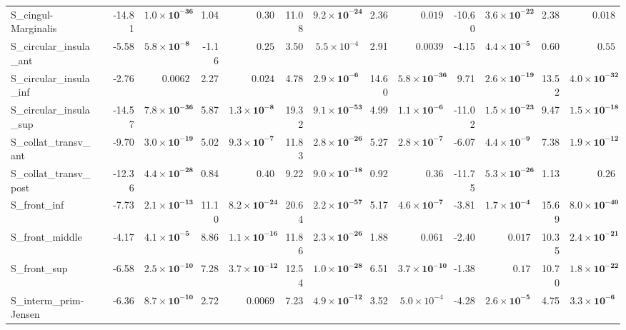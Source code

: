 {\begin{longtable}{llrrrrrrrrrrrr}
S\_cingul-Marginalis &  & -14.81 & $\mathbf{1.0{\times}10^{-36}}$ & 1.04 & $0.30$ & 11.08 & $\mathbf{9.2{\times}10^{-24}}$ & 2.36 & $0.019$ & -10.60 & $\mathbf{3.6{\times}10^{-22}}$ & 2.38 & $0.018$ \\
S\_circular\_insula\_ant &  & -5.58 & $\mathbf{5.8{\times}10^{-8}}$ & -1.16 & $0.25$ & 3.50 & $5.5{\times}10^{-4}$ & 2.91 & $0.0039$ & -4.15 & $\mathbf{4.4{\times}10^{-5}}$ & 0.60 & $0.55$ \\
S\_circular\_insula\_inf &  & -2.76 & $0.0062$ & 2.27 & $0.024$ & 4.78 & $\mathbf{2.9{\times}10^{-6}}$ & 14.60 & $\mathbf{5.8{\times}10^{-36}}$ & 9.71 & $\mathbf{2.6{\times}10^{-19}}$ & 13.52 & $\mathbf{4.0{\times}10^{-32}}$ \\
S\_circular\_insula\_sup &  & -14.57 & $\mathbf{7.8{\times}10^{-36}}$ & 5.87 & $\mathbf{1.3{\times}10^{-8}}$ & 19.32 & $\mathbf{9.1{\times}10^{-53}}$ & 4.99 & $\mathbf{1.1{\times}10^{-6}}$ & -11.02 & $\mathbf{1.5{\times}10^{-23}}$ & 9.47 & $\mathbf{1.5{\times}10^{-18}}$ \\
S\_collat\_transv\_ant &  & -9.70 & $\mathbf{3.0{\times}10^{-19}}$ & 5.02 & $\mathbf{9.3{\times}10^{-7}}$ & 11.83 & $\mathbf{2.8{\times}10^{-26}}$ & 5.27 & $\mathbf{2.8{\times}10^{-7}}$ & -6.07 & $\mathbf{4.4{\times}10^{-9}}$ & 7.38 & $\mathbf{1.9{\times}10^{-12}}$ \\
S\_collat\_transv\_post &  & -12.36 & $\mathbf{4.4{\times}10^{-28}}$ & 0.84 & $0.40$ & 9.22 & $\mathbf{9.0{\times}10^{-18}}$ & 0.92 & $0.36$ & -11.75 & $\mathbf{5.3{\times}10^{-26}}$ & 1.13 & $0.26$ \\
S\_front\_inf &  & -7.73 & $\mathbf{2.1{\times}10^{-13}}$ & 11.10 & $\mathbf{8.2{\times}10^{-24}}$ & 20.64 & $\mathbf{2.2{\times}10^{-57}}$ & 5.17 & $\mathbf{4.6{\times}10^{-7}}$ & -3.81 & $\mathbf{1.7{\times}10^{-4}}$ & 15.69 & $\mathbf{8.0{\times}10^{-40}}$ \\
S\_front\_middle &  & -4.17 & $\mathbf{4.1{\times}10^{-5}}$ & 8.86 & $\mathbf{1.1{\times}10^{-16}}$ & 11.86 & $\mathbf{2.3{\times}10^{-26}}$ & 1.88 & $0.061$ & -2.40 & $0.017$ & 10.35 & $\mathbf{2.4{\times}10^{-21}}$ \\
S\_front\_sup &  & -6.58 & $\mathbf{2.5{\times}10^{-10}}$ & 7.28 & $\mathbf{3.7{\times}10^{-12}}$ & 12.54 & $\mathbf{1.0{\times}10^{-28}}$ & 6.51 & $\mathbf{3.7{\times}10^{-10}}$ & -1.38 & $0.17$ & 10.70 & $\mathbf{1.8{\times}10^{-22}}$ \\
S\_interm\_prim-Jensen &  & -6.36 & $\mathbf{8.7{\times}10^{-10}}$ & 2.72 & $0.0069$ & 7.23 & $\mathbf{4.9{\times}10^{-12}}$ & 3.52 & $5.0{\times}10^{-4}$ & -4.28 & $\mathbf{2.6{\times}10^{-5}}$ & 4.75 & $\mathbf{3.3{\times}10^{-6}}$ \\

\end{longtable}}
